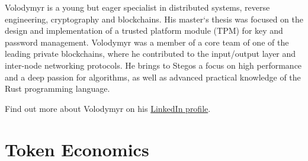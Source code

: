 \documentclass[8pt,fleqn,openany]{book}
\begin{document}
{{Volodymyr is a young but eager specialist in distributed systems, reverse engineering, cryptography and blockchains. His master`s thesis was focused on the design and implementation of a trusted platform module (TPM) for key and password management. Volodymyr was a member of a core team of one of the leading private blockchains, where he contributed to the input/output layer and inter-node networking protocols. He brings to Stegos a focus on high performance and a deep passion for algorithms, as well as advanced practical knowledge of the Rust programming language.

Find out more about Volodymyr on his \href{https://linkedin.com/in/vldm}{LinkedIn profile}.
}

\chapter{Token Economics}\label{app:token-economics}

}
\end{document}
